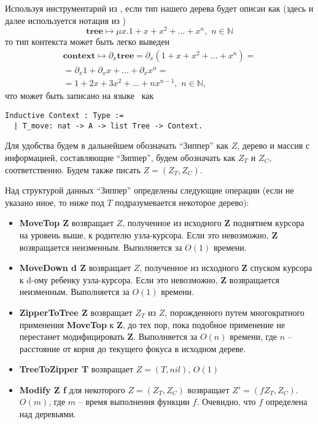 Используя инструментарий из \autocite{McBride2009}, если тип нашего дерева будет описан как (здесь и далее используется нотация из \autocite{McBride2009})
\begin{equation*}
\textbf{tree} \mapsto \mu x. 1 + x + x^2 + \dotsc + x^n, \,\, n \in \mathbb{N}
\end{equation*}   
то тип контекста может быть легко выведен
\begin{multline*}
\textbf{context} \mapsto \partial_x \textbf{tree} = \partial_x \left( 1 + x + x^2 + \dotsc + x^n \right)  = \\
= \partial_x 1 + \partial_x x + \dotsc + \partial_x x^n = \\
= 1 + 2x + 3x^2 + \dotsc + nx^{n-1}, \,\, n \in \mathbb{N},
\end{multline*}
что может быть записано на языке \tcoq~как
\begin{lstlisting}
Inductive Context : Type :=
  | T_move: nat -> A -> list Tree -> Context.
\end{lstlisting}

Для удобства будем в дальнейшем обозначать ``Зиппер'' как $Z$, дерево и массив с информацией, составляющие ``Зиппер'', будем обозначать как $Z_T$ и $Z_C$, соответственно. Будем также писать $Z = (Z_T, Z_C)$.

Над структурой данных ``Зиппер'' определены следующие операции (если не указано иное, то ниже под $T$ подразумевается некоторое дерево):
\begin{itemize}
\item \textbf{MoveTop Z} возвращает $Z$, полученное из исходного \textbf{Z} поднятием курсора на уровень выше, к родителю узла-курсора. Если это невозможно, \textbf{Z} возвращается неизменным. Выполняется за $O(1)$ времени.
\item \textbf{MoveDown d Z} возвращает $Z$, полученное из исходного \textbf{Z} спуском курсора к d-ому ребенку узла-курсора. Если это невозможно, \textbf{Z} возвращается неизменным. Выполняется за $O(1)$ времени.
\item \textbf{ZipperToTree Z} возвращает $Z_T$ из $Z$, порожденного путем многократного применения \textbf{MoveTop} к \textbf{Z}, до тех пор, пока подобное применение не перестанет модифицировать \textbf{Z}. Выполняется за $O(n)$ времени, где $n$ -- расстояние от корня до текущего фокуса в исходном дереве.
\item \textbf{TreeToZipper T} возвращает $Z = (T, nil)$, $O(1)$
\item \textbf{Modify Z f} для некоторого $Z = (Z_T, Z_C)$ возвращает $Z' = (f Z_T, Z_C)$. $O(m)$, где $m$ -- время выполнения функции $f$. Очевидно, что $f$ определена над деревьями.
\end{itemize}

